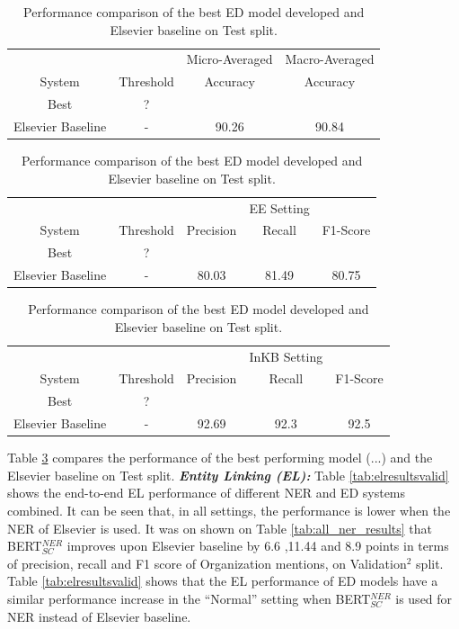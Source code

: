 \documentclass{report}
\theoremstyle{definition}
\theoremstyle{remark}
\begin{document}
\begin{table}
    \centering
    \begin{tabular}{cccc}
    &&Micro-Averaged & Macro-Averaged\\
    System    & Threshold & Accuracy &Accuracy \\
    \hline
    Best  & ? & \\
    Elsevier Baseline & - & 90.26&	90.84\\
    \end{tabular}
    
    \vspace{0.5cm}\begin{tabular}{ccccc}
    &&&EE Setting & \\
    System    & Threshold & Precision & Recall & F1-Score \\
    \hline
    Best  & ? & \\
    Elsevier Baseline & - & 80.03&	81.49&	80.75\\
    \end{tabular}
    
    \vspace{0.5cm}\begin{tabular}{ccccc}
    &&&InKB Setting & \\
    System    & Threshold & Precision & Recall & F1-Score \\
    \hline
    Best  & ? & \\
    Elsevier Baseline & - & 92.69&	92.3&	92.5\\
    \end{tabular}
    		

    \caption{Performance comparison of the best ED model developed and Elsevier baseline on Test split.}
    \label{tab:edresultstest}
\end{table}
Table \ref{tab:edresultstest} compares the performance of the best performing model (...) and the Elsevier baseline on Test split.
\newline
\newline
\noindent \textit{\textbf{Entity Linking (EL):}} Table \ref{tab:elresultsvalid} shows the end-to-end EL performance of different NER and ED systems combined. It can be seen that, in all settings, the performance is lower when the NER of Elsevier is used. It was on shown on Table \ref{tab:all_ner_results} that BERT$_{SC}^{NER}$ improves upon Elsevier baseline by 6.6 ,11.44 and 8.9 points in terms of precision, recall and F1 score of Organization mentions, on Validation$^2$ split. Table \ref{tab:elresultsvalid} shows that the EL performance of ED models have a similar performance increase in the ``Normal'' setting when BERT$_{SC}^{NER}$ is used for NER instead of Elsevier baseline. 
\end{document}
